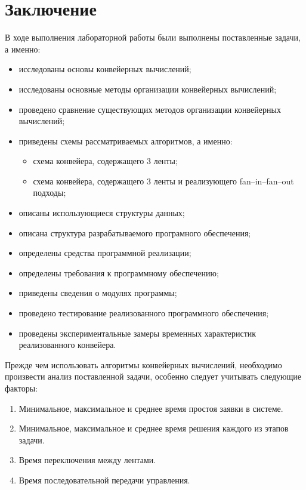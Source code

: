 \chapter*{Заключение}

В ходе выполнения лабораторной работы были выполнены поставленные задачи, а именно:
\begin{itemize}
	\item исследованы основы конвейерных вычислений;
	\item исследованы основные методы организации конвейерных вычислений;
	\item проведено сравнение существующих методов организации конвейерных вычислений; 
	\item приведены схемы рассматриваемых алгоритмов, а именно:
	\begin{itemize}
		\item схема конвейера, содержащего 3 ленты;
		\item схема конвейера, содержащего 3 ленты и реализующего fan--in–fan--out подходы;
	\end{itemize}
	\item описаны использующиеся структуры данных;
	\item описана структура разрабатываемого програмного обеспечения;
	\item определены средства программной реализации;
	\item определены требования к программному обеспечению;
	\item приведены сведения о модулях программы;
	\item проведено тестирование реализованного программного обеспечения;
	\item проведены экспериментальные замеры временных характеристик реализованного конвейера.
\end{itemize}

Прежде чем использовать алгоритмы конвейерных вычислений, необходимо произвести анализ поставленной
задачи, особенно следует учиты­вать следующие факторы:

\begin{enumerate}
	\item Минимальное, максимальное и среднее время простоя заявки в системе.
	\item Минимальное, максимальное и среднее время решения каждого из этапов задачи.
	\item Время переключения между лентами.
	\item Время последовательной передачи управления.
\end{enumerate}

